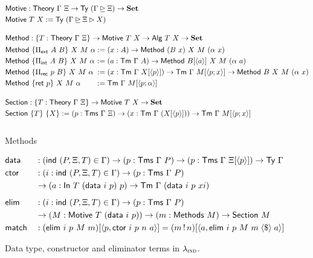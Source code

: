 \newcommand{\Msub}[1]{\langle{#1}\rangle}

\begin{figure}[H]
  \begin{align*}
  &\mta{Motive} : \Theory\ \Gamma\ \Xi \to \Ty\ (\Gamma \unrhd \Xi) \to \Set \\
  &\mta{Motive}\ T\ X := \Ty\ (\Gamma \unrhd \Xi \rhd X) \\[1em]
  &\mta{Method} : \{T : \Theory\ \Gamma\ \Xi\} \to \mta{Motive}\ T\ X \to \mta{Alg}\ T\ X \to \Set \\
  &\begin{alignedat}{2}
  &\mta{Method}\ \{\Pi_{\mta{ext}}\ A\ B\}\ X\ M\ \alpha &&:= (x : A) \to \mta{Method}\ (B\ x)\ X\ M\ (\alpha\ x) \\
  &\mta{Method}\ \{\Pi_{\mta{int}}\ A\ B\}\ X\ M\ \alpha &&:= (a : \Tm\ \Gamma\ A) \to \mta{Method}\ B [\langle a \rangle]\ X\ M\ (\alpha\ a) \\
  &\mta{Method}\ \{\Pi_{\mta{rec}}\ p\ B\}\ X\ M\ \alpha &&:= (x : \Tm\ \Gamma\ X [\langle p \rangle]) \to \Tm\ \Gamma\ M [\langle p ; x \rangle] \to \mta{Method}\ B\ X\ M\ (\alpha\ x) \\
  &\mta{Method}\ \{\mta{ret}\ p\}\ X\ M\ \alpha &&:= \Tm\ \Gamma\ M [\langle p ; \alpha \rangle]
  \end{alignedat} \\[1em]
  &\mta{Section} : \{T : \Theory\ \Gamma\ \Xi\} \to \mta{Motive}\ T\ X \to \Set \\
  &\mta{Section}\ \{T\}\ \{X\} := (p : \Tms\ \Gamma\ \Xi) \to (x : \Tm\ \Gamma\ (X[\Msub p])) \to \Tm\ \Gamma\ M[\Msub {p; x}] \\[1em]
  \end{align*}
  \caption{Methods}
  \label{fig:lambdaind-motive-methods}
\end{figure}

\newcommand{\fmap}{\;\langle\$\rangle\;}

\begin{figure}[H]
  \begin{alignat*}{2}
  & \mta{data} &&: (\mta{ind}\ (P, \Xi, T) \in \Gamma) \to (p : \Tms\ \Gamma\ P) \to (p : \Tms\ \Gamma\ \Xi[\langle p \rangle]) \to \Ty\ \Gamma \\
  & \mta{ctor} &&: (i : \mta{ind}\ (P, \Xi, T) \in \Gamma) \to (p : \Tms\ \Gamma\ P) \\
  &            && \to (a : \mta{In}\ T\ (\mta{data}\ i\ p)\ p) \to \Tm\ \Gamma\ (\mta{data}\ i\ p\ xi) \\[0.5em]
  & \mta{elim} &&: (i : \mta{ind}\ (P, \Xi, T) \in \Gamma) \to (p : \Tms\ \Gamma\ P) \\
  &            && \to (M : \mta{Motive}\ T\ (\mta{data}\ i\ p)) \to (m : \mta{Methods}\ M) \to \mta{Section}\ M \\
  & \mta{match} &&: (\mta{elim}\ i\ p\ M\ m)[\langle p, \mta{ctor}\ i\ p\ n\ a \rangle] = (m\,!\,n)[\langle a , \mta{elim}\ i\ p\ M\ m \fmap a \rangle]
  \end{alignat*}
  \caption{Data type, constructor and eliminator terms in $\lambda_{\textsc{ind}}$.}
  \label{fig:lambdaind-data-ctor}
\end{figure}

